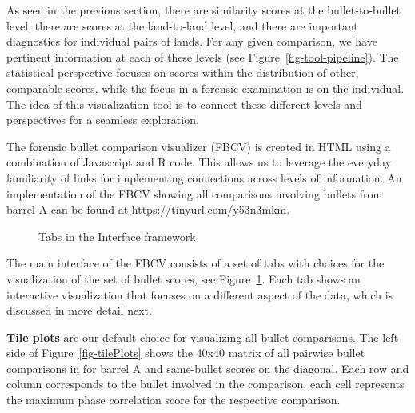 \documentclass[
  12pt]{article}
\begin{document}
As seen in the previous section, there are similarity scores at the
bullet-to-bullet level, there are scores at the land-to-land level, and
there are important diagnostics for individual pairs of lands. For any
given comparison, we have pertinent information at each of these levels
(see Figure~\ref{fig-tool-pipeline}). The statistical perspective
focuses on scores within the distribution of other, comparable scores,
while the focus in a forensic examination is on the individual. The idea
of this visualization tool is to connect these different levels and
perspectives for a seamless exploration.

The forensic bullet comparison visualizer (FBCV) is created in HTML
using a combination of Javascript and R code. This allows us to leverage
the everyday familiarity of links for implementing connections across
levels of information. An implementation of the FBCV showing all
comparisons involving bullets from barrel A can be found at
\url{https://tinyurl.com/y53n3mkm}.

\begin{figure}


\caption{\label{fig-framework-interface}Tabs in the Interface framework}

\end{figure}%

The main interface of the FBCV consists of a set of tabs with choices
for the visualization of the set of bullet scores, see
Figure~\ref{fig-framework-interface}. Each tab shows an interactive
visualization that focuses on a different aspect of the data, which is
discussed in more detail next. \hfill\newline

\textbf{Tile plots} are our default choice for visualizing all bullet
comparisons. The left side of Figure~\ref{fig-tilePlots} shows the 40x40
matrix of all pairwise bullet comparisons in for barrel A and
same-bullet scores on the diagonal. Each row and column corresponds to
the bullet involved in the comparison, each cell represents the maximum
phase correlation score for the respective comparison.
\end{document}
